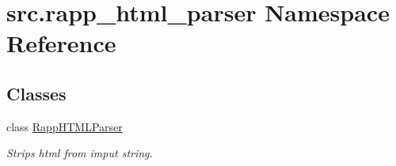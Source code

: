 \hypertarget{namespacesrc_1_1rapp__html__parser}{\section{src.\-rapp\-\_\-html\-\_\-parser Namespace Reference}
\label{namespacesrc_1_1rapp__html__parser}
}
\subsection*{Classes}
\begin{DoxyCompactItemize}
\item 
class \hyperlink{classsrc_1_1rapp__html__parser_1_1RappHTMLParser}{Rapp\-H\-T\-M\-L\-Parser}
\begin{DoxyCompactList}\small\item\em Strips html from imput string. \end{DoxyCompactList}\end{DoxyCompactItemize}
